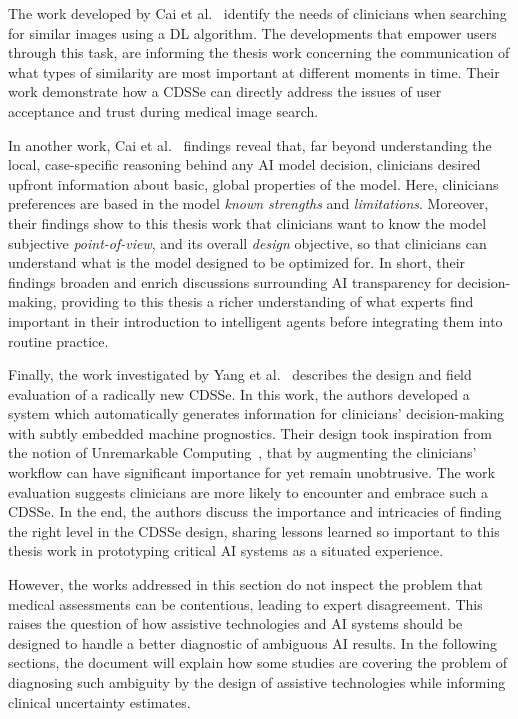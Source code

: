 The work developed by Cai et al.~\cite{Cai:2019:HTC:3290605.3300234} identify the needs of clinicians when searching for similar images using a \ac{DL} algorithm.
The developments that empower users through this task, are informing the thesis work concerning the communication of what types of similarity are most important at different moments in time.
Their work demonstrate how a \ac{CDSSe} can directly address the issues of user acceptance and trust during medical image search.

In another work, Cai et al.~\cite{10.1145/3359206} findings reveal that, far beyond understanding the local, case-specific reasoning behind any \ac{AI} model decision, clinicians desired upfront information about basic, global properties of the model.
Here, clinicians preferences are based in the model {\it known strengths} and {\it limitations}.
Moreover, their findings show to this thesis work that clinicians want to know the model subjective {\it point-of-view}, and its overall {\it design} objective, so that clinicians can understand what is the model designed to be optimized for.
In short, their findings broaden and enrich discussions surrounding \ac{AI} transparency for decision-making, providing to this thesis a richer understanding of what experts find important in their introduction to intelligent agents before integrating them into routine practice.

Finally, the work investigated by Yang et al.~\cite{10.1145/3290605.3300468} describes the design and field evaluation of a radically new \ac{CDSSe}.
In this work, the authors developed a system which automatically generates information for clinicians' decision-making with subtly embedded machine prognostics.
Their design took inspiration from the notion of Unremarkable Computing~\cite{Crabtree2020}, that by augmenting the clinicians' workflow can have significant importance for yet remain unobtrusive.
The work evaluation suggests clinicians are more likely to encounter and embrace such a \ac{CDSSe}.
In the end, the authors discuss the importance and intricacies of finding the right level in the \ac{CDSSe} design, sharing lessons learned so important to this thesis work in prototyping critical \ac{AI} systems as a situated experience.

However, the works addressed in this section do not inspect the problem that medical assessments can be contentious, leading to expert disagreement.
This raises the question of how assistive technologies and \ac{AI} systems should be designed to handle a better diagnostic of ambiguous \ac{AI} results.
In the following sections, the document will explain how some studies are covering the problem of diagnosing such ambiguity by the design of assistive technologies while informing clinical uncertainty estimates.

